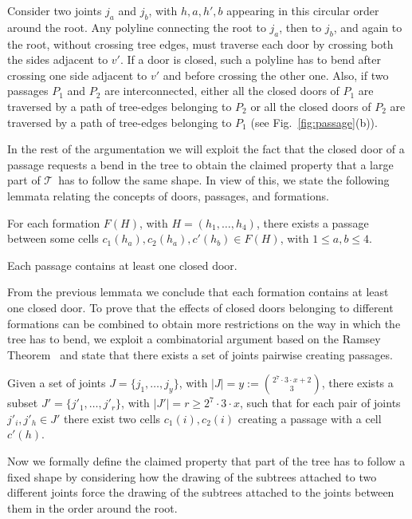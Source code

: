 \documentclass[a4paper,10pt]{llncs}
\newcounter{prop}
\newcommand{\T}{\mbox{$\mathcal T$ }}
\begin{document}
Consider two joints $j_a$ and $j_b$, with $h,a,h',b$ appearing in this circular order around the root. Any polyline connecting the root to $j_a$, then to $j_b$, and again to the root, without crossing tree edges, must traverse each door by crossing both the sides adjacent to $v'$. If a door is closed, such a polyline has to bend after crossing one side adjacent to $v'$ and before crossing the other one.
Also, if two passages $P_1$ and $P_2$ are interconnected, either all the closed doors of $P_1$ are traversed by a path of tree-edges belonging to $P_2$ or all the closed doors of $P_2$ are traversed by a path of tree-edges belonging to $P_1$ (see Fig.~\ref{fig:passage}(b)).

In the rest of the argumentation we will exploit the fact that the closed door of a passage requests a bend in the tree to obtain the claimed property that a large part of \T has to follow the same shape. In view of this, we state the following lemmata relating the concepts of doors, passages, and formations.

\begin{lemma}\label{lemma:PS_passage}
For each formation $F(H)$, with $H=(h_1, \ldots ,h_4)$, there exists a passage between some cells $c_1(h_a),c_2(h_a),c'(h_b) \in F(H)$, with $1 \leq a,b \leq 4$.
\end{lemma}

\begin{lemma}\label{lemma:closed_door_in_each_passage}
Each passage contains at least one closed door.
\end{lemma}

From the previous lemmata we conclude that each formation contains at least one closed door. To prove that the effects of closed doors belonging to different formations can be combined to obtain more restrictions on the way in which the tree has to bend, we exploit a combinatorial argument based on the Ramsey Theorem~\cite{grs-rt-90} and state that there exists a set of joints pairwise creating passages.

\begin{lemma}\label{lemma:k_cluster_passage}
Given a set of joints $J=\{j_1,\ldots ,j_y\}$, with $|J|=y:= {2^7\cdot 3\cdot x + 2 \choose 3}$, there exists a subset $J'=\{j'_1,\ldots ,j'_r\}$, with $|J'|=r \geq 2^7\cdot 3\cdot x$, such that for each pair of joints $j'_i,j'_h \in J'$ there exist two cells $c_1(i),c_2(i)$ creating a passage with a cell $c'(h)$.
\end{lemma}

Now we formally define the claimed property that part of the tree has to follow a fixed shape by considering how the drawing of the subtrees attached to two different joints force the drawing of the subtrees attached to the joints between them in the order around the root.
\end{document}
